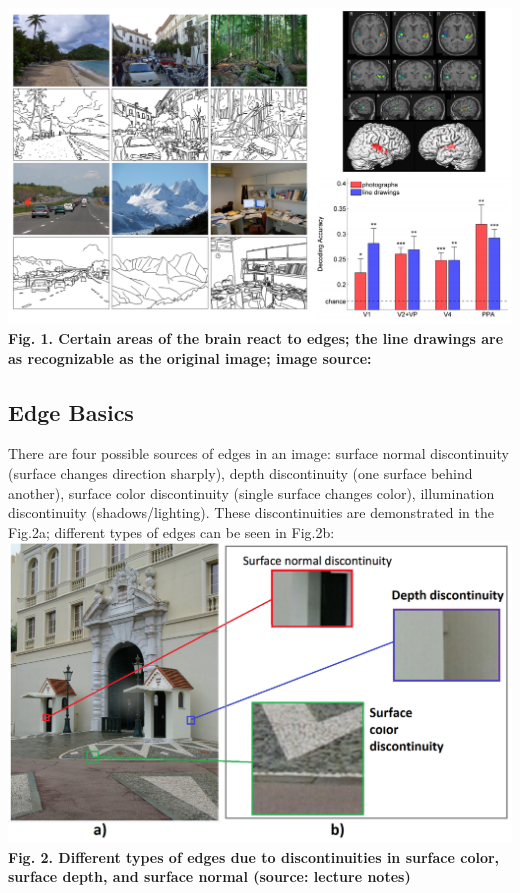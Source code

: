 \documentclass{article}
\begin{document}
\includegraphics[width=\textwidth]{line_drawings.png}
\textbf{Fig. 1. Certain areas of the brain react to edges; the line drawings are as recognizable as the original image; image source: \cite{line_drawings}}

\subsection{Edge Basics}
There are four possible sources of edges in an image:  surface normal discontinuity (surface changes direction sharply), depth discontinuity (one surface behind another), surface color discontinuity (single surface changes color), illumination discontinuity (shadows/lighting).  These discontinuities are demonstrated in the Fig.2a; different types of edges can be seen in Fig.2b:
\FloatBarrier
\includegraphics[width=\textwidth]{overall.png}
\FloatBarrier
\textbf{Fig. 2. Different types of edges due to discontinuities in surface color, surface depth, and surface normal (source: lecture notes)}
\end{document}

